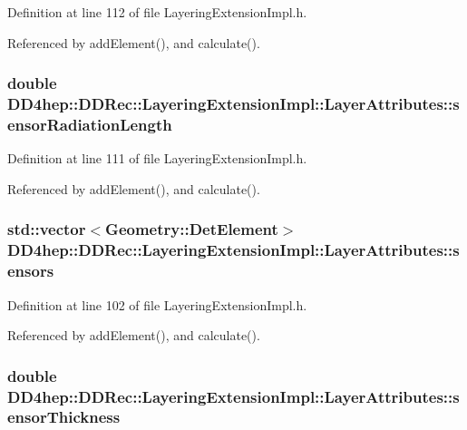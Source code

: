 Definition at line 112 of file LayeringExtensionImpl.h.

Referenced by addElement(), and calculate().\hypertarget{struct_d_d4hep_1_1_d_d_rec_1_1_layering_extension_impl_1_1_layer_attributes_addc3c7d619e7a52a23222ec6ffed2833}{
\subsubsection[{sensorRadiationLength}]{\setlength{\rightskip}{0pt plus 5cm}double {\bf DD4hep::DDRec::LayeringExtensionImpl::LayerAttributes::sensorRadiationLength}}}
\label{struct_d_d4hep_1_1_d_d_rec_1_1_layering_extension_impl_1_1_layer_attributes_addc3c7d619e7a52a23222ec6ffed2833}


Definition at line 111 of file LayeringExtensionImpl.h.

Referenced by addElement(), and calculate().\hypertarget{struct_d_d4hep_1_1_d_d_rec_1_1_layering_extension_impl_1_1_layer_attributes_ae2f7cbcf5fd427fc4655bf769003909a}{
\subsubsection[{sensors}]{\setlength{\rightskip}{0pt plus 5cm}std::vector$<${\bf Geometry::DetElement}$>$ {\bf DD4hep::DDRec::LayeringExtensionImpl::LayerAttributes::sensors}}}
\label{struct_d_d4hep_1_1_d_d_rec_1_1_layering_extension_impl_1_1_layer_attributes_ae2f7cbcf5fd427fc4655bf769003909a}


Definition at line 102 of file LayeringExtensionImpl.h.

Referenced by addElement(), and calculate().\hypertarget{struct_d_d4hep_1_1_d_d_rec_1_1_layering_extension_impl_1_1_layer_attributes_a7d63afe728d3ef686cc9130188abce0e}{
\subsubsection[{sensorThickness}]{\setlength{\rightskip}{0pt plus 5cm}double {\bf DD4hep::DDRec::LayeringExtensionImpl::LayerAttributes::sensorThickness}}}
\label{struct_d_d4hep_1_1_d_d_rec_1_1_layering_extension_impl_1_1_layer_attributes_a7d63afe728d3ef686cc9130188abce0e}


